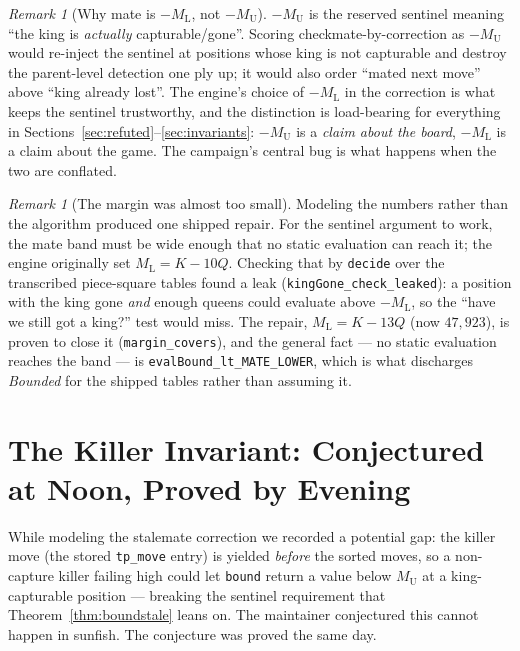 \documentclass[11pt]{article}
\newcommand{\MU}{M_{\mathrm{U}}}    %
\newcommand{\ML}{M_{\mathrm{L}}}    %
\theoremstyle{plain}
\theoremstyle{definition}
\theoremstyle{remark}
\newtheorem{remark}[theorem]{Remark}
\begin{document}
\begin{remark}[Why mate is $-\ML$, not $-\MU$]
$-\MU$ is the reserved sentinel meaning ``the king is \emph{actually}
capturable/gone''.  Scoring checkmate-by-correction as $-\MU$ would
re-inject the sentinel at positions whose king is not capturable and
destroy the parent-level detection one ply up; it would also order
``mated next move'' above ``king already lost''.  The engine's choice of
$-\ML$ in the correction is what keeps the sentinel trustworthy, and
the distinction is load-bearing for everything in
Sections~\ref{sec:refuted}--\ref{sec:invariants}: $-\MU$ is a
\emph{claim about the board}, $-\ML$ is a claim about the game.  The
campaign's central bug is what happens when the two are conflated.
\end{remark}

\begin{remark}[The margin was almost too small]
\label{rem:margin}
Modeling the numbers rather than the algorithm produced one shipped
repair.  For the sentinel argument to work, the mate band must be wide
enough that no static evaluation can reach it; the engine originally
set $\ML = K - 10Q$.  Checking that by \texttt{decide} over the
transcribed piece-square tables found a leak
(\texttt{kingGone\_check\_leaked}): a position with the king gone
\emph{and} enough queens could evaluate above $-\ML$, so the ``have we
still got a king?'' test would miss.  The repair, $\ML = K - 13Q$
(now $47{,}923$), is proven to close it (\texttt{margin\_covers}), and
the general fact --- no static evaluation reaches the band --- is
\texttt{evalBound\_lt\_MATE\_LOWER}, which is what discharges
\emph{Bounded} for the shipped tables rather than assuming it.
\end{remark}

\section{The Killer Invariant: Conjectured at Noon, Proved by Evening}
\label{sec:killer}

While modeling the stalemate correction we recorded a potential gap: the
killer move (the stored \texttt{tp\_move} entry) is yielded \emph{before}
the sorted moves, so a non-capture killer failing high could let
\texttt{bound} return a value below $\MU$ at a king-capturable position
--- breaking the sentinel requirement that
Theorem~\ref{thm:boundstale} leans on.  The maintainer conjectured this
cannot happen in sunfish.  The conjecture was proved the same day.
\end{document}

